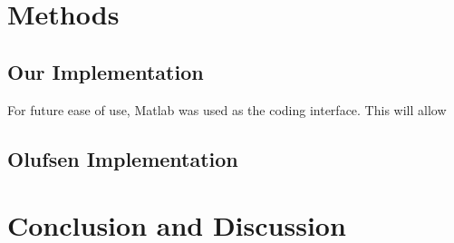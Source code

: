 \documentclass[12pt]{article}
\begin{document}
\section{Methods}
\subsection{Our Implementation}
For future ease of use, Matlab was used as the coding interface. This will allow

\subsection{Olufsen Implementation}

\section{Conclusion and Discussion}



\end{document}
